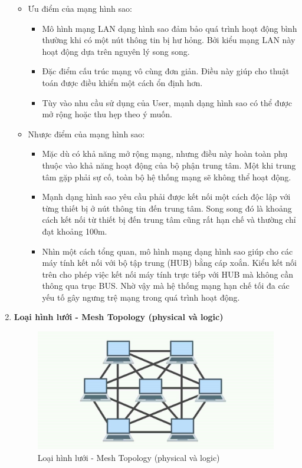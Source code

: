 \documentclass[13pt]{article}
\begin{document}
\begin{enumerate}
\begin{itemize}
    \item Ưu điểm của mạng hình sao:
        \begin{itemize}
            \item Mô hình mạng LAN dạng hình sao đảm bảo quá trình hoạt động bình thường khi có một nút thông tin bị hư hỏng. Bởi kiểu mạng LAN này hoạt động dựa trên nguyên lý song song.
            \item Đặc điểm cấu trúc mạng vô cùng đơn giản. Điều này giúp cho thuật toán được điều khiển một cách ổn định hơn.
            \item Tùy vào nhu cầu sử dụng của User, mạnh dạng hình sao có thể được mở rộng hoặc thu hẹp theo ý muốn.
        \end{itemize}
    \item Nhược điểm của mạng hình sao:
        \begin{itemize}
            \item Mặc dù có khả năng mở rộng mạng, nhưng điều này hoàn toàn phụ thuộc vào khả năng hoạt động của bộ phận trung tâm. Một khi trung tâm gặp phải sự cố, toàn bộ hệ thống mạng sẽ không thể hoạt động.
            \item Mạnh dạng hình sao yêu cầu phải được kết nối một cách độc lập với từng thiết bị ở nút thông tin đến trung tâm. Song song đó là khoảng cách kết nối từ thiết bị đến trung tâm cũng rất hạn chế và thường chỉ đạt khoảng 100m.
            \item Nhìn một cách tổng quan, mô hình mạng dạng hình sao giúp cho các máy tính kết nối với bộ tập trung (HUB) bằng cáp xoắn. Kiểu kết nối trên cho phép việc kết nối máy tính trực tiếp với HUB mà không cần thông qua trục BUS. Nhờ vậy mà hệ thống mạng hạn chế tối đa các yếu tố gây ngưng trệ mạng trong quá trình hoạt động.
        \end{itemize}
    \end{itemize}

    \item \textbf{Loại hình lưới - Mesh Topology (physical và logic)}
    \begin{figure}[h!]
        \centering
        \includegraphics[width=0.7\linewidth]{image/8.jpg}
            \caption{Loại hình lưới - Mesh Topology (physical và logic)}
            \label{fig:label1}
    \end{figure}


\end{enumerate}
\end{document}
